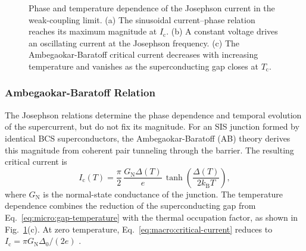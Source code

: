             \begin{figure}[t]
                \captionsetup{format=plain}%
                \centering
                \hfill
                \hfill
                \caption{
                    Phase and temperature dependence of the Josephson current in the weak-coupling limit. (a) The sinusoidal current--phase relation reaches its maximum magnitude at $I_\mathrm{c}$. (b) A constant voltage drives an oscillating current at the Josephson frequency. (c) The Ambegaokar-Baratoff critical current decreases with increasing temperature and vanishes as the superconducting gap closes at $T_\mathrm{c}$.
                }
                \label{fig:macro:josephson}
            \end{figure}

        \subsubsection*{Ambegaokar-Baratoff Relation}

            The Josephson relations determine the phase dependence and temporal evolution of the supercurrent, but do not fix its magnitude. For an SIS junction formed by identical BCS superconductors, the Ambegaokar-Baratoff (AB) theory derives this magnitude from coherent pair tunneling through the barrier. The resulting critical current is
            \begin{equation}
                I_\mathrm{c}(T) = \frac{\pi}{2}\,\frac{G_\mathrm{N}\Delta(T)}{e}\,
                \tanh\!\left(\frac{\Delta(T)}{2k_\mathrm{B}T}\right),
                \label{eq:macro:critical-current}
            \end{equation}
            where $G_\mathrm{N}$ is the normal-state conductance of the junction. The temperature dependence combines the reduction of the superconducting gap from Eq.~\eqref{eq:micro:gap-temperature} with the thermal occupation factor, as shown in Fig.~\ref{fig:macro:josephson}(c). At zero temperature, Eq.~\eqref{eq:macro:critical-current} reduces to $I_\mathrm{c}=\pi G_\mathrm{N}\Delta_0/(2e)$ \cite{ambegaokar_tunneling_1963}.

